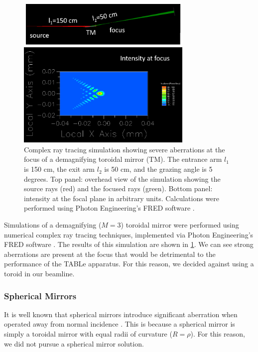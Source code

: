 \begin{figure}
	\centering
	\includegraphics[width=0.75\textwidth]{figures/chap2/TM_coma.png}
	\caption{Complex ray tracing simulation showing severe aberrations at the focus of a demagnifying toroidal mirror (TM). The entrance arm $l_1$ is 150 cm, the exit arm $l_2$ is 50 cm, and the grazing angle is 5 degrees. Top panel: overhead view of the simulation showing the source rays (red) and the focused rays (green). Bottom panel: intensity at the focal plane in arbitrary units. Calculations were performed using Photon Engineering's FRED software \cite{pfistererFREDOpticalEngineering}.}
	\label{fig:TM_coma}
\end{figure}

Simulations of a demagnifying ($M=3$) toroidal mirror were performed using numerical complex ray tracing techniques, implemented via Photon Engineering's FRED software \cite{pfistererFREDOpticalEngineering,arnaudRepresentationGaussianBeams1985}. The results of this simulation are shown in \cref{fig:TM_coma}. We can see strong aberrations are present at the focus that would be detrimental to the performance of the TABLe apparatus. For this reason, we decided against using a toroid in our beamline.

\subsubsection{Spherical Mirrors}

It is well known that spherical mirrors introduce significant aberration when operated away from normal incidence \cite{howellsMirrorsSynchrotronRadiationBeamlines1994}. This is because a spherical mirror is simply a toroidal mirror with equal radii of curvature ($R=\rho$). For this reason, we did not pursue a spherical mirror solution.

